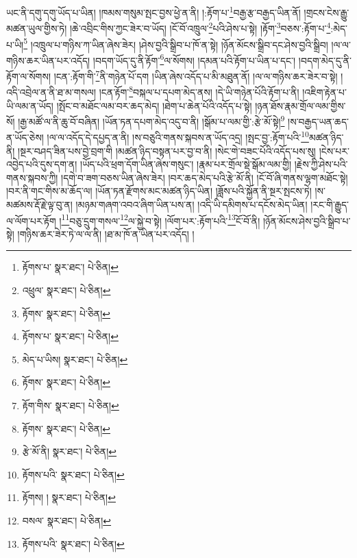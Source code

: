 ཡང་ནི་དགུ་དགུ་ཡོད་པ་ཡིན། །ཁམས་གསུམ་སྤང་བྱས་ཕྱེ་ན་ནི། །:རྟོག་པ་\footnote{རྟོགས་པ་  སྣར་ཐང་།  པེ་ཅིན། }བརྒྱ་རྩ་བརྒྱད་ཡིན་ནོ། །གྲངས་ངེས་རྒྱུ་མཚན་ཡུལ་གྱིས་ཏེ། །ཆེ་འབྲིང་གིས་ཀྱང་ཟེར་བ་ཡོད། །ངོ་བོ་འཁྲུལ་\footnote{འཕྲུལ་  སྣར་ཐང་།  པེ་ཅིན། }པའི་ཤེས་པ་སྟེ། །རྟོག་\footnote{རྟོགས་  སྣར་ཐང་།  པེ་ཅིན། }བཅས་:རྟོག་པ་\footnote{རྟོགས་པ་  སྣར་ཐང་།  པེ་ཅིན། }:མེད་པ་ཡི།\footnote{མེད་པ་ཡིས།  སྣར་ཐང་།  པེ་ཅིན། } །འཁྲུལ་པ་གཉིས་ཀ་ཡིན་ཞེས་ཟེར། །ཤེས་བྱའི་སྒྲིབ་པ་ཁོ་ན་སྟེ། །ཉོན་མོངས་སྒྲིབ་དང་ཤེས་བྱའི་སྒྲིབ། །ལ་ལ་གཉིས་ཆར་ཡིན་པར་འདོད། །བདག་ཡོད་དུ་ནི་རྟོག་\footnote{རྟོགས་  སྣར་ཐང་།  པེ་ཅིན། }ལ་སོགས། །དམན་པའི་རྟོག་པ་ཡིན་པ་དང་། །བདག་མེད་དུ་ནི་རྟོག་ལ་སོགས། །ངན་:རྟོག་གི་\footnote{རྟོག་གིས་  སྣར་ཐང་།  པེ་ཅིན། }ནི་གཉེན་པོ་དག །ཡིན་ཞེས་འདོད་པ་མི་མཐུན་ནོ། །ལ་ལ་གཉིས་ཆར་ཟེར་བ་སྟེ། །འདི་འབྲེལ་ན་ནི་ཐ་མ་གསལ། །ངན་རྟོག་\footnote{རྟོགས་  སྣར་ཐང་།  པེ་ཅིན། }བསྐལ་པ་དཔག་མེད་ནས། །དེ་ཡི་གཉེན་པོའི་རྟོག་པ་ནི། །འཇིག་རྟེན་པ་ཡི་ལམ་ན་ཡོད། །སྤོང་བ་མཐོང་ལམ་བར་ཆད་མེད། །ཐེག་པ་ཆེན་པོའི་འདོད་པ་སྟེ། །ཉན་ཐོས་རྣམ་གྲོལ་ལམ་གྱིས་སོ། །རྒྱ་མཚོ་ལ་ནི་ཆུ་བོ་བཞིན། །ཡོན་ཏན་དཔག་མེད་འདུ་བ་ནི། །སྒོམ་པ་ལམ་གྱི་:རྩེ་མོ་སྟེ།\footnote{རྩེ་མོ་ནི།  སྣར་ཐང་།  པེ་ཅིན། } །ས་བརྒྱད་ཡན་ཆད་ན་ཡོད་ཅེས། །ལ་ལ་འདོད་དེ་དཔྱད་ན་ནི། །ས་བཅུའི་གནས་སྐབས་ན་ཡོད་འདྲ། །སྤང་བྱ་:རྟོག་པའི་\footnote{རྟོགས་པའི་  སྣར་ཐང་།  པེ་ཅིན། }མཚན་ཉིད་ནི། །སྔར་བཤད་ཟིན་པས་བྱེ་བྲག་གི །མཚན་ཉིད་བསྟན་པར་བྱ་བ་ནི། །སེང་གེ་བཟང་པོའི་འདོད་པས་སུ། །ངེས་པར་འབྱེད་པའི་དུས་དག་ན། །ཡོད་པའི་ཕྲག་དོག་ཡིན་ཞེས་གསུང་། །རྣམ་པར་གྲོལ་སྡེ་སྒོམ་ལམ་གྱི། །རྗེས་ཀྱི་ཤེས་པའི་གནས་སྐབས་ཀྱི། །དགེ་བ་ཟག་བཅས་ཡིན་ཞེས་ཟེར། །བར་ཆད་མེད་པའི་རྩེ་མོ་ནི། །ངོ་བོ་ཞི་གནས་ལྷག་མཐོང་སྟེ། །བར་ནི་གང་གིས་མ་ཆོད་ལ། །ཡོན་ཏན་རྫོགས་མང་མཚན་ཉིད་ཡིན། །ཟློས་པའི་སྐྱོན་ནི་སྔར་སྤངས་ཏེ། །ས་མཚམས་རྡོ་རྗེ་ལྟ་བུ་ན། །མཉམ་གཞག་འབའ་ཞིག་ཡིན་པས་ན། །འདི་ཡི་དམིགས་པ་དངོས་མེད་ཡིན། །རང་གི་རྒྱུད་ལ་ལོག་པར་རྟོག །\footnote{རྟོགས། །  སྣར་ཐང་།  པེ་ཅིན། }བཅུ་དྲུག་གསལ་\footnote{བསལ་  སྣར་ཐང་།  པེ་ཅིན། }ལ་སྐྱེ་བ་སྟེ། །ལོག་པར་:རྟོག་པའི་\footnote{རྟོགས་པའི་  སྣར་ཐང་།  པེ་ཅིན། }ངོ་བོ་ནི། །ཉོན་མོངས་ཤེས་བྱའི་སྒྲིབ་པ་སྟེ། །གཉིས་ཆར་ཟེར་ཏེ་ལ་ལ་ནི། །ཐ་མ་ཁོ་ན་ཡིན་པར་འདོད། །
